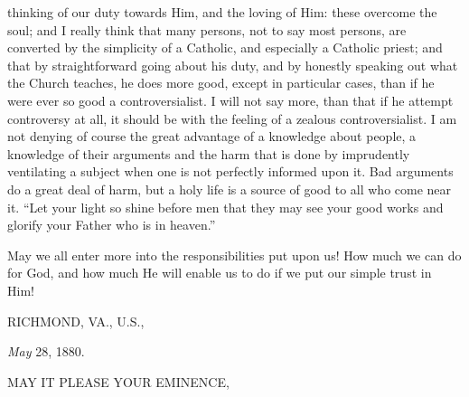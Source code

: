 thinking of our duty towards Him, and the loving of Him: these
overcome the soul; and I really think that many persons, not to
say most persons, are converted by the simplicity of a Catholic, and
especially a Catholic priest; and that by straightforward going about
his duty, and by honestly speaking out what the Church teaches, he
does more good, except in particular cases, than if he were ever so
good a controversialist. I will not say more, than that if he attempt
controversy at all, it should be with the feeling of a zealous
controversialist. I am not denying of course the great advantage of a
knowledge about people, a knowledge of their arguments and the harm
that is done by imprudently ventilating a subject when one is not
perfectly informed upon it. Bad arguments do a great deal of harm, but
a holy life is a source of good to all who come near it. ``Let
your light so shine before men that they may see your good works and
glorify your Father who is in heaven.''

May we all enter more into the responsibilities put upon us! How
much we can do for God, and how much He will enable us to do if we put
our simple trust in Him!


RICHMOND, VA., U.S.,

\emph{May} 28, 1880.

MAY IT PLEASE
YOUR EMINENCE,

